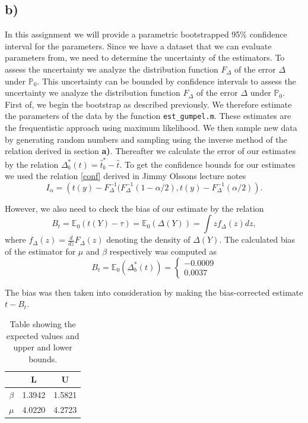 \subsection*{b)}
In this assignment we will provide a parametric bootstrapped 95\% confidence interval for the parameters. Since we have a dataset that we can evaluate parameters from, we need to determine the uncertainty of the estimators. To assess the uncertainty we analyze the distribution function $F_{\Delta}$ of the error $\Delta$ under $\mathbb{P}_0$. This uncertainty can be bounded by confidence intervals to assess the uncertainty we analyze the distribution function $F_{\Delta}$ of the error $\Delta$ under $\mathbb{P}_0$. \\

First of, we begin the bootstrap as described previously. We therefore estimate the parameters of the data by the function \texttt{est\_gumpel.m}. These estimates are the frequentistic approach using maximum likelihood. We then sample new data by generating random numbers and sampling using the inverse method of the relation derived in section \textbf{a)}. Thereafter we calculate the error of our estimates by the relation $\Delta_b^*(t)=\hat{t}_b^*-\hat{t}$. To get the confidence bounds for our estimates we used the relation \eqref{conf} derived in Jimmy Olssons lecture notes \cite{JO} 
\begin{equation} I_{\alpha}=\left(t(y) - F_\Delta^{-1}(F_\Delta^{-1}(1-\alpha/2),t(y)-F_\Delta^{-1}(\alpha/2)\right).
\label{conf}
 \end{equation}

However, we also need to check the bias of our estimate by the relation
\[ B_t=\mathbb{E}_0(t(Y)-\tau)=\mathbb{E}_0(\Delta(Y))=\int zf_\Delta (z) dz, \]
where $f_\Delta(z)=\frac{d}{dz}F_\Delta(z)$ denoting the density of $\Delta(Y)$. The calculated bias of the estimator for $\mu$ and $\beta$ respectively was computed as 
\[ B_t = \mathbb{E}_0(\Delta_b^*(t))=\left\{ \begin{array}{l}
-0.0009 \\ 0.0037
\end{array}\right. \]

The bias was then taken into consideration by making the bias-corrected estimate $t-B_t$. 

\begin{table}
\centering
\begin{tabular}{|c|c|c|}
\hline

 & L & U \\ \hline
$\beta$ & 1.3942 & 1.5821 \\ \hline
$\mu$ & 4.0220 & 4.2723 \\ \hline

\end{tabular}
\caption{Table showing the expected values and upper and lower bounds.}
\end{table}

